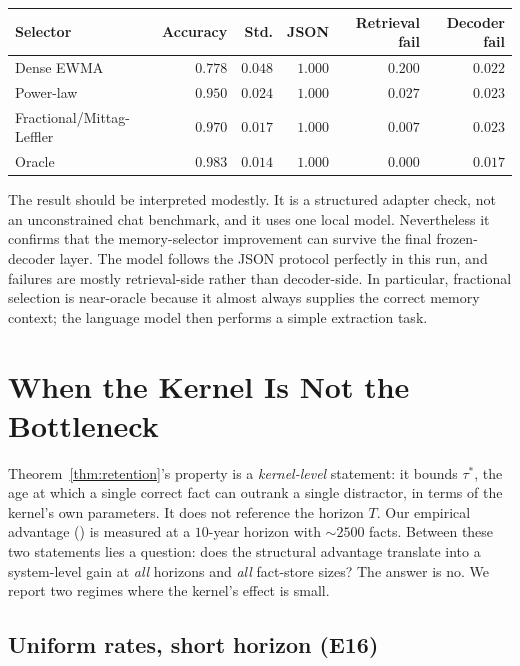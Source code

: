 \documentclass[11pt]{article}
\theoremstyle{plain}
\theoremstyle{definition}
\begin{document}
\begin{center}
\begin{tabular}{@{}lrrrrr@{}}
\toprule
Selector & Accuracy & Std. & JSON & Retrieval fail & Decoder fail \\
\midrule
Dense EWMA & $0.778$ & $0.048$ & $1.000$ & $0.200$ & $0.022$ \\
Power-law & $0.950$ & $0.024$ & $1.000$ & $0.027$ & $0.023$ \\
Fractional/Mittag-Leffler & $\mathbf{0.970}$ & $0.017$ & $1.000$ & $0.007$ & $0.023$ \\
Oracle & $0.983$ & $0.014$ & $1.000$ & $0.000$ & $0.017$ \\
\bottomrule
\end{tabular}
\end{center}

The result should be interpreted modestly.  It is a
structured adapter check, not an unconstrained chat
benchmark, and it uses one local model.  Nevertheless it
confirms that the memory-selector improvement can survive
the final frozen-decoder layer.  The model follows the
JSON protocol perfectly in this run, and failures are
mostly retrieval-side rather than decoder-side.  In
particular, fractional selection is near-oracle because it
almost always supplies the correct memory context; the
language model then performs a simple extraction task.



\section{When the Kernel Is Not the
Bottleneck}\label{sec:when_kernel_secondary}

Theorem~\ref{thm:retention}'s property is a
\emph{kernel-level} statement: it bounds $\tau^*$,
the age at which a single correct fact can outrank a
single distractor, in terms of the kernel's own
parameters.  It does not reference the horizon $T$.
Our empirical advantage () is
measured at a $10$-year horizon with $\sim\!2500$
facts.  Between these two statements lies a question:
does the structural advantage translate into a
system-level gain at \emph{all} horizons and
\emph{all} fact-store sizes?  The answer is no.  We
report two regimes where the kernel's effect is
small.

\subsection{Uniform rates, short horizon (E16)}
\end{document}

